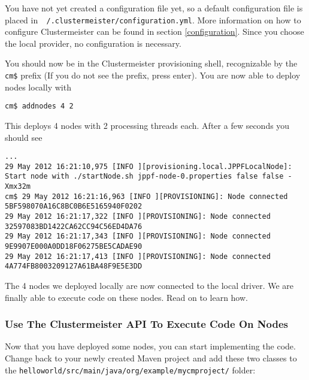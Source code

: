 You have not yet created a configuration file yet, so a default configuration file is placed in\texttt{ ~/.clustermeister/configuration.yml}. More information on how to configure Clustermeister can be found in section \ref{configuration}. Since you choose the local provider, no configuration is necessary.

You should now be in the Clustermeister provisioning shell, recognizable by the \texttt{cm\$} prefix (If you do not see the prefix, press enter). You are now able to deploy nodes locally with

\begin{lstlisting}[breaklines=true, backgroundcolor=\color{lbcolor}]
cm$ addnodes 4 2
\end{lstlisting}

This deploys 4 nodes with 2 processing threads each. After a few seconds you should see

\begin{lstlisting}[breaklines=true, backgroundcolor=\color{lbcolor}]
...
29 May 2012 16:21:10,975 [INFO ][provisioning.local.JPPFLocalNode]: Start node with ./startNode.sh jppf-node-0.properties false false -Xmx32m
cm$ 29 May 2012 16:21:16,963 [INFO ][PROVISIONING]: Node connected 5BF598070A16C8BC0B6E5165940F0202
29 May 2012 16:21:17,322 [INFO ][PROVISIONING]: Node connected 32597083BD1422CA62CC94C56ED4DA76
29 May 2012 16:21:17,343 [INFO ][PROVISIONING]: Node connected 9E9907E000A0DD18F06275BE5CADAE90
29 May 2012 16:21:17,413 [INFO ][PROVISIONING]: Node connected 4A774FB8003209127A61BA48F9E5E3DD
\end{lstlisting}

The 4 nodes we deployed locally are now connected to the local driver. We are finally able to execute code on these nodes. Read on to learn how.

\subsubsection{Use The Clustermeister API To Execute Code On Nodes}

Now that you have deployed some nodes, you can start implementing the code. Change back to your newly created Maven project and add these two classes to the \texttt{helloworld/src/main/java/org/example/mycmproject/} folder:





